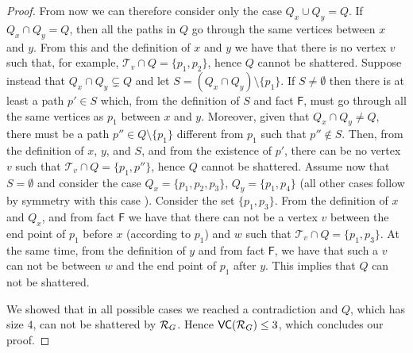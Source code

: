 \begin{proof}
  From now we can therefore consider only the case $Q_x\cup Q_y=Q$. If $Q_x\cap
  Q_y=Q$, then all the paths in $Q$ go through the same vertices between $x$ and
  $y$. From this and the definition of $x$ and $y$ we have that there is no
  vertex $v$ such that, for example, $\mathcal{T}_v\cap Q=\{p_1,p_2\}$, hence
  $Q$ cannot be shattered. Suppose instead that $Q_x\cap Q_y\subsetneq Q$ and let $S=(Q_x\cap
  Q_y)\setminus\{p_1\}$. If $S\neq\emptyset$ then there is at least a path
  $p'\in S$ which, from the definition of $S$ and fact $\mathsf{F}$, must go
  through all the same vertices as $p_1$ between $x$ and $y$. Moreover, given
  that $Q_x\cap Q_y\neq Q$, there must be a path $p''\in Q\setminus\{p_1\}$
  different from $p_1$ such that $p''\notin S$. Then, from the definition of
  $x$, $y$, and $S$, and from the existence of $p'$, there can be no vertex $v$
  such that $\mathcal{T}_v\cap Q=\{p_1,p''\}$, hence $Q$ cannot be shattered.
  Assume now that $S=\emptyset$ and consider the case $Q_x=\{p_1,p_2,p_3\}$,
  $Q_y=\{p_1,p_4\}$ (all other cases follow by symmetry with this case ).
  Consider the set $\{p_1,p_3\}$. From the definition of $x$ and $Q_x$, and from
  fact $\mathsf{F}$ we have that there can not be a vertex $v$ between the end
  point of $p_1$ before $x$ (according to $p_1$) and $w$ such that $\mathcal{T}_v\cap Q=\{p_1,p_3\}$.
  At the same time, from the definition of $y$ and from fact $\mathsf{F}$, we
  have that such a $v$ can not be between $w$ and the end point of $p_1$ after
  $y$. This implies that $Q$ can not be shattered.

  We showed that in all possible cases we reached a contradiction and $Q$,
  which has size $4$, can not be shattered by $\mathcal{R}_G$. Hence $\mathsf{VC}(\mathcal{R}_G)\le
  3$, which concludes our proof.
\end{proof}


